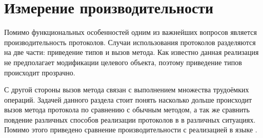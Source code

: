 \section{Измерение производительности}
Помимо функциональных особенностей одним из важнейших вопросов является производительность протоколов. Случаи использования протоколов разделяются на две части: приведение типов и вызов метода. Как известно данная реализация не предполагает модификации целевого объекта, поэтому приведение типов происходит прозрачно.

С другой стороны вызов метода связан с выполнением множества трудоёмких операций. Задачей данного раздела стоит понять насколько дольше происходит вызов метода протокола по сравнению с обычным методом, а так же сравнить повдение различных способов реализации протоколов в  в различных ситуациях. Помимо этого приведено сравнение производительности с реализацией в языке .



